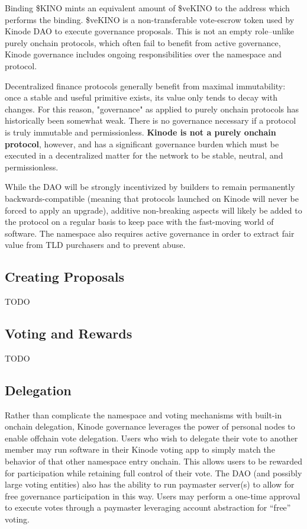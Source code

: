 \documentclass[runningheads]{llncs}
\begin{document}
Binding \$KINO mints an equivalent amount of \$veKINO to the address which performs the binding.
\$veKINO is a non-transferable vote-escrow token used by Kinode DAO to execute governance proposals.
This is not an empty role–unlike purely onchain protocols, which often fail to benefit from active governance, Kinode governance includes ongoing responsibilities over the namespace and protocol.

Decentralized finance protocols generally benefit from maximal immutability: once a stable and useful primitive exists, its value only tends to decay with changes.
For this reason, "governance" as applied to purely onchain protocols has historically been somewhat weak.
There is no governance necessary if a protocol is truly immutable and permissionless. \textbf{Kinode is not a purely onchain protocol}, however, and has a significant governance burden which must be executed in a decentralized matter for the network to be stable, neutral, and permissionless.

While the DAO will be strongly incentivized by builders to remain permanently backwards-compatible (meaning that protocols launched on Kinode will never be forced to apply an upgrade), additive non-breaking aspects will likely be added to the protocol on a regular basis to keep pace with the fast-moving world of software. The namespace also requires active governance in order to extract fair value from TLD purchasers and to prevent abuse.

\subsection{Creating Proposals}

TODO

\subsection{Voting and Rewards}

TODO

\subsection{Delegation}

Rather than complicate the namespace and voting mechanisms with built-in onchain delegation, Kinode governance leverages the power of personal nodes to enable offchain vote delegation.
Users who wish to delegate their vote to another member may run software in their Kinode voting app to simply match the behavior of that other namespace entry onchain.
This allows users to be rewarded for participation while retaining full control of their vote.
The DAO (and possibly large voting entities) also has the ability to run paymaster server(s) to allow for free governance participation in this way.
Users may perform a one-time approval to execute votes through a paymaster leveraging account abstraction for “free” voting.
\end{document}
